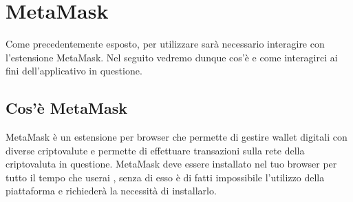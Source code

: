\section{MetaMask}\label{section:MetaMask}
Come precedentemente esposto, per utilizzare \projectName{} sarà necessario interagire con l'estensione MetaMask. Nel seguito vedremo dunque cos'è e come interagirci ai fini dell'applicativo in questione.
\subsection{Cos'è MetaMask}
MetaMask è un estensione per browser che permette di gestire wallet\glo{} digitali con diverse criptovalute\glo{} e permette di effettuare transazioni sulla rete della criptovaluta in questione.
MetaMask deve essere installato nel tuo browser per tutto il tempo che userai \projectName{}, senza di esso è di fatti impossibile l'utilizzo della piattaforma e richiederà la necessità di installarlo.

